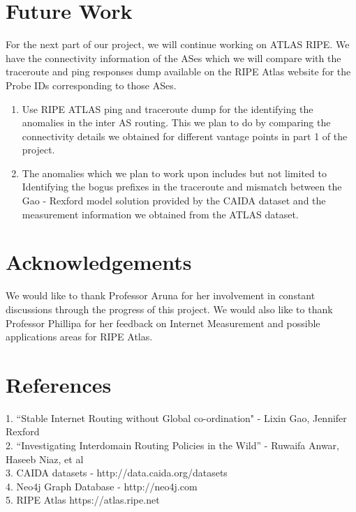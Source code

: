 \documentclass{sig-alternate-05-2015}
\begin{document}
\section{Future Work}
For the next part of our project, we will continue working on ATLAS RIPE. We have the connectivity information of the ASes which we will compare with the traceroute and ping responses dump available on the RIPE Atlas website for the Probe IDs corresponding to those ASes.
\begin{enumerate}
\item Use RIPE ATLAS ping and traceroute dump for the identifying the anomalies in the inter AS routing. This we plan to do by comparing the connectivity details we obtained for different vantage points in part 1 of the project. 
\item The anomalies which we plan to work upon includes but not limited to Identifying the bogus prefixes in the traceroute and mismatch between the Gao - Rexford model solution provided by the CAIDA dataset and the measurement information we obtained from the ATLAS dataset.


\end{enumerate}

\section{Acknowledgements}
We would like to thank Professor Aruna for her involvement in constant discussions through the progress of this project. We would also like to thank Professor Phillipa for her feedback on Internet Measurement and possible applications areas for RIPE Atlas.

\section{References}
1. ``Stable Internet Routing without Global co-ordination" - Lixin Gao, Jennifer Rexford\\
2. ``Investigating Interdomain Routing Policies in the Wild'' - Ruwaifa Anwar, Haseeb Niaz, et al\\
3. CAIDA datasets - http://data.caida.org/datasets \\
4. Neo4j Graph Database - http://neo4j.com\\
5. RIPE Atlas https://atlas.ripe.net\\
\end{document}
